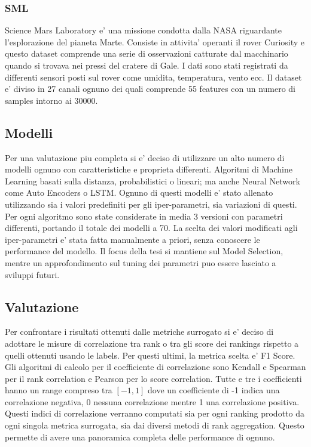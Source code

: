 \subsubsection{SML}
Science Mars Laboratory e' una missione condotta dalla NASA riguardante l'esplorazione del pianeta Marte. Consiste in attivita' operanti il rover Curiosity e questo dataset comprende una serie di osservazioni catturate dal macchinario quando si trovava nei pressi del cratere di Gale. I dati sono stati registrati da differenti sensori posti sul rover come umidita, temperatura, vento ecc. Il dataset e' diviso in 27 canali ognuno dei quali comprende 55 features con un numero di samples intorno ai 30000.


\subsection{Modelli}
Per una valutazione piu completa si e' deciso di utilizzare un alto numero di modelli ognuno con caratteristiche e proprieta differenti. Algoritmi di Machine Learning basati sulla distanza, probabilistici o lineari; ma anche Neural Network come Auto Encoders o LSTM.
Ognuno di questi modelli e' stato allenato utilizzando sia i valori predefiniti per gli iper-parametri, sia variazioni di questi. 
Per ogni algoritmo sono state considerate in media 3 versioni con parametri differenti, portando il totale dei modelli a 70.
La scelta dei valori modificati agli iper-parametri e' stata fatta manualmente a priori, senza conoscere le performance del modello. Il focus della tesi si mantiene sul Model Selection, mentre un approfondimento sul tuning dei parametri puo essere lasciato a sviluppi futuri.

\subsection{Valutazione}
Per confrontare i risultati ottenuti dalle metriche surrogato si e' deciso di adottare le misure di correlazione tra rank o tra gli score dei rankings rispetto a quelli ottenuti usando le labels. Per questi ultimi, la metrica scelta e' F1 Score.
Gli algoritmi di calcolo per il coefficiente di correlazione sono Kendall e Spearman per il rank correlation e Pearson per lo score correlation. Tutte e tre i coefficienti hanno un range compreso tra $[-1,1]$ dove un coefficiente di -1 indica una correlazione negativa, 0 nessuna correlazione mentre 1 una correlazione positiva.
Questi indici di correlazione verranno computati sia per ogni ranking prodotto da ogni singola metrica surrogata, sia dai diversi metodi di rank aggregation. Questo permette di avere una panoramica completa delle performance di ognuno.



